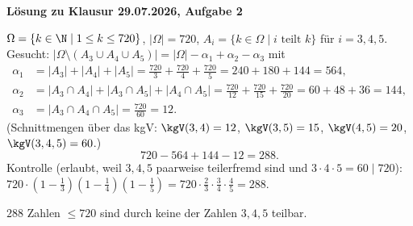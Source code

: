 \textbf{Lösung zu Klausur 29.07.2026, Aufgabe 2}

$\Omega = \{k \in \N \mid 1 \le k \le 720\}$, $|\Omega| = 720$, $A_i = \{k \in \Omega \mid i \text{ teilt } k\}$ für $i = 3, 4, 5$.
Gesucht: $|\Omega \setminus (A_3 \cup A_4 \cup A_5)| = |\Omega| - \alpha_1 + \alpha_2 - \alpha_3$ mit
\begin{align*}
\alpha_1 &= |A_3| + |A_4| + |A_5| = \tfrac{720}{3} + \tfrac{720}{4} + \tfrac{720}{5} = 240 + 180 + 144 = 564,\\
\alpha_2 &= |A_3 \cap A_4| + |A_3 \cap A_5| + |A_4 \cap A_5| = \tfrac{720}{12} + \tfrac{720}{15} + \tfrac{720}{20} = 60 + 48 + 36 = 144,\\
\alpha_3 &= |A_3 \cap A_4 \cap A_5| = \tfrac{720}{60} = 12 .
\end{align*}
(Schnittmengen über das kgV: $\kgV(3,4) = 12$, $\kgV(3,5) = 15$, $\kgV(4,5) = 20$, $\kgV(3,4,5) = 60$.)
\[
720 - 564 + 144 - 12 = 288 .
\]
Kontrolle (erlaubt, weil $3, 4, 5$ paarweise teilerfremd sind und $3 \cdot 4 \cdot 5 = 60 \mid 720$): $720 \cdot (1 - \tfrac13)(1 - \tfrac14)(1 - \tfrac15) = 720 \cdot \tfrac23 \cdot \tfrac34 \cdot \tfrac45 = 288$.
\begin{ergebnis} $288$ Zahlen $\le 720$ sind durch keine der Zahlen $3, 4, 5$ teilbar. \end{ergebnis}

